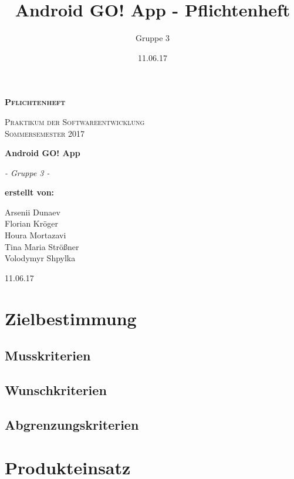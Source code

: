 \documentclass[parskip=full]{scrartcl}
\title{Android GO! App - Pflichtenheft}
\author{Gruppe 3}
\date{11.06.17}
\begin{document}
\begin{titlepage}
	\begin{center}
	{\scshape\LARGE \bfseries Pflichtenheft \par}
	\vspace{1cm}
	{\scshape\Large Praktikum der Softwareentwicklung \\ Sommersemester 2017\par}
	\vspace{1.5cm}
	{\huge\bfseries Android GO! App\par}
	\vspace{2cm}
	{\Large\itshape - Gruppe 3 -\par}
	\vfill
	{\bfseries erstellt von:\par}
	Arsenii Dunaev \\ %
	Florian Kröger \\
	Houra Mortazavi \\ %
	Tina Maria Strößner \\
	Volodymyr Shpylka \\	
	\vfill
	{\large 11.06.17 \par}	
	\end{center}
\end{titlepage}

\tableofcontents


\section{Zielbestimmung}

\subsection{Musskriterien}
\subsection{Wunschkriterien}
\subsection{Abgrenzungskriterien}


\section{Produkteinsatz}
\end{document}
